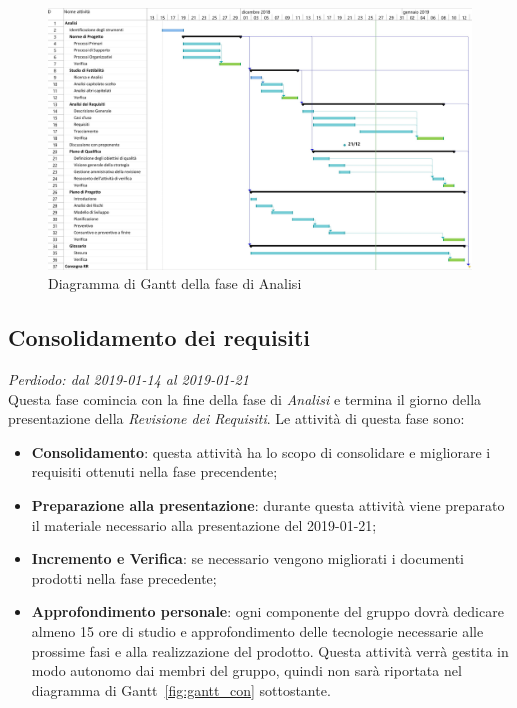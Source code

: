 \begin{figure}[H]
	\includegraphics[width=0.99\linewidth]{res/images/gantt_analisi1.jpg}
	\caption{Diagramma di Gantt della fase di Analisi}
\end{figure}


\subsection{Consolidamento dei requisiti}
\textit{Perdiodo: dal 2019-01-14 al 2019-01-21} \\
Questa fase comincia con la fine della fase di \textit{Analisi} e termina il 
giorno della presentazione della \textit{Revisione dei Requisiti}. Le attività 
di questa fase sono:
\begin{itemize}
	\item \textbf{Consolidamento}: questa attività ha lo scopo di consolidare e 
	migliorare i requisiti ottenuti nella fase precendente;
	\item \textbf{Preparazione alla presentazione}: durante questa attività 
	viene preparato il materiale necessario alla presentazione del 2019-01-21;
	\item \textbf{Incremento e Verifica}: se necessario vengono migliorati i 
	documenti prodotti nella fase precedente;
	\item \textbf{Approfondimento personale}: ogni componente del gruppo dovrà 
	dedicare almeno 15 ore di studio e approfondimento delle tecnologie 
	necessarie alle prossime fasi e alla realizzazione del prodotto. Questa 
	attività verrà gestita in modo autonomo dai membri del gruppo, quindi non 
	sarà riportata nel diagramma di Gantt~\ref{fig:gantt_con} sottostante.
\end{itemize}

